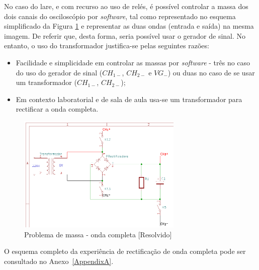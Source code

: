 No caso do \acrshort{lare}, e com recurso ao uso de relés, é possível controlar a massa dos dois canais do osciloscópio por \textit{software}, tal como representado no esquema simplificado da Figura \ref{fig:ondacompleta-massa} e representar as duas ondas (entrada e saída) na mesma imagem. De referir que, desta forma, seria possível usar o gerador de sinal. No entanto, o uso do transformador justifica-se pelas seguintes razões:
\begin{itemize}
	\item Facilidade e simplicidade em controlar as massas por \textit{software} - três no caso do uso do gerador de sinal ($CH_{1-}$, $CH_{2-}$ e $VG_{-}$) ou duas no caso de se usar um transformador ($CH_{1-}$, $CH_{2-}$);
	\item Em contexto laboratorial e de sala de aula usa-se um transformador para rectificar a onda completa.
\end{itemize}


\begin{figure}[hbtp]
	\centering
	\includegraphics[width=0.7\textwidth]{figures/sch-ondacompleta-massa.png}
	\caption{Problema de massa - onda completa [Resolvido]}
	\label{fig:ondacompleta-massa}
\end{figure}

O esquema completo da experiência de rectificação de onda completa pode ser consultado no Anexo~\ref{AppendixA}.

